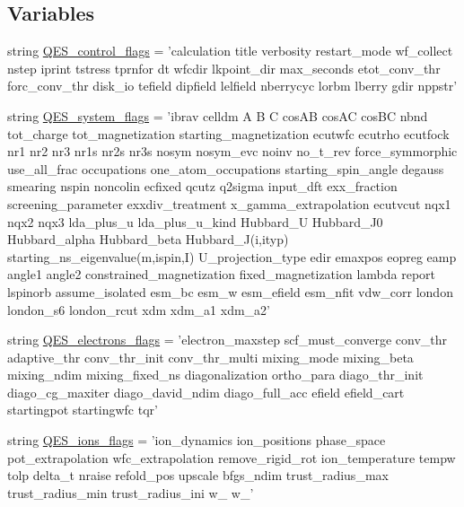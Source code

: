 \subsection*{Variables}
\begin{DoxyCompactItemize}
\item 
string \hyperlink{namespace_d_f_t___k_i_t_1_1calculator_1_1_q_e_s_p_r_e_s_s_o_af7b03c15432c08ac6f347a3a09d50a3f}{Q\+E\+S\+\_\+control\+\_\+flags} = 'calculation title verbosity restart\+\_\+mode wf\+\_\+collect nstep iprint tstress tprnfor dt wfcdir lkpoint\+\_\+dir max\+\_\+seconds etot\+\_\+conv\+\_\+thr forc\+\_\+conv\+\_\+thr disk\+\_\+io tefield dipfield lelfield nberrycyc lorbm lberry gdir nppstr'
\item 
string \hyperlink{namespace_d_f_t___k_i_t_1_1calculator_1_1_q_e_s_p_r_e_s_s_o_a4fc2949def8bc4b8a2802d0e542f63dc}{Q\+E\+S\+\_\+system\+\_\+flags} = 'ibrav celldm A B C cos\+A\+B cos\+A\+C cos\+B\+C nbnd tot\+\_\+charge tot\+\_\+magnetization starting\+\_\+magnetization ecutwfc ecutrho ecutfock nr1 nr2 nr3 nr1s nr2s nr3s nosym nosym\+\_\+evc noinv no\+\_\+t\+\_\+rev force\+\_\+symmorphic use\+\_\+all\+\_\+frac occupations one\+\_\+atom\+\_\+occupations starting\+\_\+spin\+\_\+angle degauss smearing nspin noncolin ecfixed qcutz q2sigma input\+\_\+dft exx\+\_\+fraction screening\+\_\+parameter exxdiv\+\_\+treatment x\+\_\+gamma\+\_\+extrapolation ecutvcut nqx1 nqx2 nqx3 lda\+\_\+plus\+\_\+u lda\+\_\+plus\+\_\+u\+\_\+kind Hubbard\+\_\+\+U Hubbard\+\_\+\+J0 Hubbard\+\_\+alpha Hubbard\+\_\+beta Hubbard\+\_\+\+J(i,ityp) starting\+\_\+ns\+\_\+eigenvalue(m,ispin,I) U\+\_\+projection\+\_\+type edir emaxpos eopreg eamp angle1 angle2 constrained\+\_\+magnetization fixed\+\_\+magnetization lambda report lspinorb assume\+\_\+isolated esm\+\_\+bc esm\+\_\+w esm\+\_\+efield esm\+\_\+nfit vdw\+\_\+corr london london\+\_\+s6 london\+\_\+rcut xdm xdm\+\_\+a1 xdm\+\_\+a2'
\item 
string \hyperlink{namespace_d_f_t___k_i_t_1_1calculator_1_1_q_e_s_p_r_e_s_s_o_a36e40202edc11d7e727685fe0f5661f0}{Q\+E\+S\+\_\+electrons\+\_\+flags} = 'electron\+\_\+maxstep scf\+\_\+must\+\_\+converge conv\+\_\+thr adaptive\+\_\+thr conv\+\_\+thr\+\_\+init conv\+\_\+thr\+\_\+multi mixing\+\_\+mode mixing\+\_\+beta mixing\+\_\+ndim mixing\+\_\+fixed\+\_\+ns diagonalization ortho\+\_\+para diago\+\_\+thr\+\_\+init diago\+\_\+cg\+\_\+maxiter diago\+\_\+david\+\_\+ndim diago\+\_\+full\+\_\+acc efield efield\+\_\+cart startingpot startingwfc tqr'
\item 
string \hyperlink{namespace_d_f_t___k_i_t_1_1calculator_1_1_q_e_s_p_r_e_s_s_o_af16e80a77f76ffc37d94100867ed5eab}{Q\+E\+S\+\_\+ions\+\_\+flags} = 'ion\+\_\+dynamics ion\+\_\+positions phase\+\_\+space pot\+\_\+extrapolation wfc\+\_\+extrapolation remove\+\_\+rigid\+\_\+rot ion\+\_\+temperature tempw tolp delta\+\_\+t nraise refold\+\_\+pos upscale bfgs\+\_\+ndim trust\+\_\+radius\+\_\+max trust\+\_\+radius\+\_\+min trust\+\_\+radius\+\_\+ini w\+\_ w\+\_'

\end{DoxyCompactItemize}
